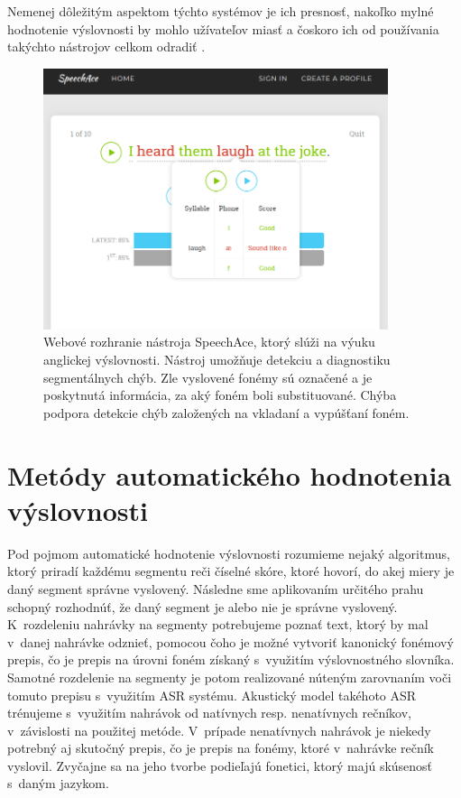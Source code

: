 Nemenej dôležitým aspektom týchto systémov je ich presnosť, nakoľko mylné hodnotenie výslovnosti by mohlo užívateľov miasť a čoskoro ich od používania takýchto nástrojov celkom odradiť \cite{Neri2006}.


\begin{figure}[h]
    \centering
    \includegraphics[width=0.9\textwidth]{figures/speechace.jpg}
    \caption{Webové rozhranie nástroja SpeechAce, ktorý slúži na výuku anglickej výslovnosti. Nástroj umožňuje detekciu a diagnostiku segmentálnych chýb. Zle vyslovené fonémy sú označené a je poskytnutá informácia, za aký foném boli substituované. Chýba podpora detekcie chýb založených na vkladaní a vypúšťaní foném.}
    \label{fig:speechace}
\end{figure}

\section{Metódy automatického hodnotenia výslovnosti} \label{sec:confidence-measures}

Pod pojmom automatické hodnotenie výslovnosti rozumieme nejaký algoritmus, ktorý priradí každému segmentu reči číselné skóre, ktoré hovorí, do akej miery je daný segment správne vyslovený. Následne sme aplikovaním určitého prahu 
schopný rozhodnúť, že daný segment je alebo nie je správne vyslovený. K~rozdeleniu nahrávky na segmenty potrebujeme poznať text, ktorý by mal v~danej nahrávke odznieť, pomocou čoho je možné vytvoriť kanonický fonémový prepis, čo je prepis na úrovni foném získaný s~využitím výslovnostného slovníka. Samotné rozdelenie na segmenty je potom realizované núteným zarovnaním voči tomuto prepisu s~využitím ASR systému. Akustický model takéhoto ASR trénujeme s~využitím nahrávok od natívnych resp. nenatívnych rečníkov, v~závislosti na použitej metóde. V~prípade nenatívnych nahrávok je niekedy potrebný aj skutočný prepis, čo je prepis na fonémy, ktoré v~nahrávke rečník vyslovil. Zvyčajne sa na jeho tvorbe podieľajú fonetici, ktorý majú skúsenosť s~daným jazykom.

